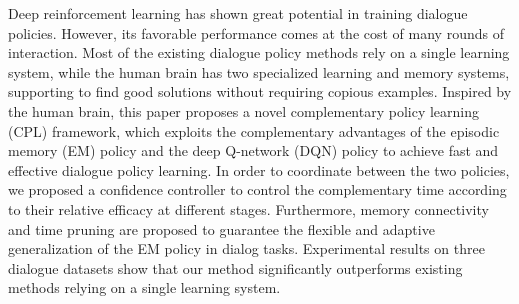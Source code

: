 Deep reinforcement learning has shown great potential in training dialogue policies. However, its favorable performance comes at the cost of many rounds of interaction. Most of the existing dialogue policy methods rely on a single learning system, while the human brain has two specialized learning and memory systems, supporting to find good solutions without requiring copious examples. Inspired by the human brain, this paper proposes a novel complementary policy learning (CPL) framework, which exploits the complementary advantages of the episodic memory (EM) policy and the deep Q-network (DQN) policy to achieve fast and effective dialogue policy learning. In order to coordinate between the two policies, we proposed a confidence controller to control the complementary time according to their relative efficacy at different stages. Furthermore, memory connectivity and time pruning are proposed to guarantee the flexible and adaptive generalization of the EM policy in dialog tasks. Experimental results on three dialogue datasets show that our method significantly outperforms existing methods relying on a single learning system.
